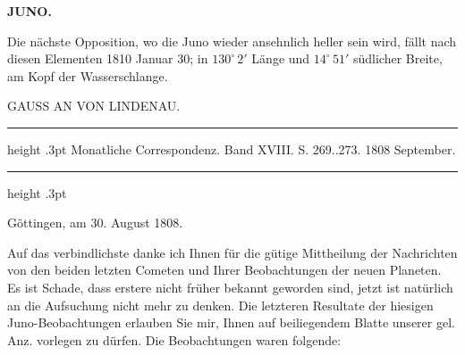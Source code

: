 \clearpage
\endgroup
\begingroup
\pagestyle{empty}
\newcommand{\GaussVICitation}[2]{%
  \begin{center}
  \parbox{#1\linewidth}{%
    \centering\footnotesize\frenchspacing
    \hrule height .3pt\relax\vspace{2.5pt}
    #2\par
    \vspace{2.5pt}\hrule height .3pt\relax
  }%
  \end{center}
  \par\nobreak\medskip
}
\newcommand{\GaussVIGathering}[2]{%
  \fancypagestyle{gaussVIGathering}{%
    \fancyhf{}%
    \renewcommand{\headrulewidth}{0pt}%
    \renewcommand{\footrulewidth}{0pt}%
    \fancyfoot[C]{\makebox[\textwidth][l]{%
      \hspace*{.025\textwidth}{\footnotesize\bfseries #1}\hfill
      {\normalsize\bfseries\textls[90]{#2}}\hspace*{.18\textwidth}}}%
  }%
  \thispagestyle{gaussVIGathering}%
}
\thispagestyle{empty}
\noindent{}%
\makebox[12mm][l]{}%
\parbox[t]{\dimexpr\linewidth-24mm\relax}{\centering\footnotesize\bfseries JUNO.\par}%
\par\nobreak\medskip
\par\indent Die nächste Opposition, wo die Juno wieder ansehnlich heller sein wird, fällt nach diesen Elementen 1810 Januar 30; in $130^\circ\,2'$ Länge und $14^\circ\,51'$ südlicher Breite, am Kopf der Wasserschlange.

\par{}\bigskip
\begin{center}
\large GAUSS AN VON LINDENAU.
\end{center}
\GaussVICitation{.83}{Monatliche Correspondenz. Band XVIII. S. 269..273. 1808 September.}

\begin{flushright}
Göttingen, am 30. August 1808.
\end{flushright}

\par\indent Auf das verbindlichste danke ich Ihnen für die gütige Mittheilung der Nachrichten von den beiden letzten Cometen und Ihrer Beobachtungen der neuen Planeten. Es ist Schade, dass erstere nicht
früher bekannt geworden sind, jetzt ist natürlich an die Aufsuchung nicht mehr zu denken. Die letzteren Resultate der hiesigen Juno-Beobachtungen erlauben Sie mir, Ihnen auf beiliegendem Blatte unserer gel. Anz. vorlegen zu dürfen. Die Beobachtungen waren folgende:


